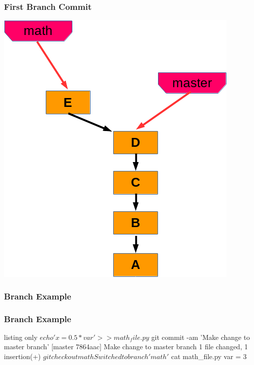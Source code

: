 \documentclass[english,compress]{beamer}
\begin{document}
\frame
{
    \frametitle{First Branch Commit}

	\begin{center}
		\includegraphics[height=.8\textheight]{figs/2-first-branch.png}
	\end{center}
}

\begin{frame}[fragile]
    \frametitle{Branch Example}
\end{frame}

\begin{frame}[fragile]
    \frametitle{Branch Example}
    \begin{tcblisting}{listing only}
$ echo 'x = 0.5 * var' >> math_file.py 
$ git commit -am 'Make change to master branch'
[master 7864aac] Make change to master branch
 1 file changed, 1 insertion(+)
$ git checkout math
Switched to branch 'math'
$ cat math_file.py 
var = 3
    \end{tcblisting}
\end{frame}
\end{document}
